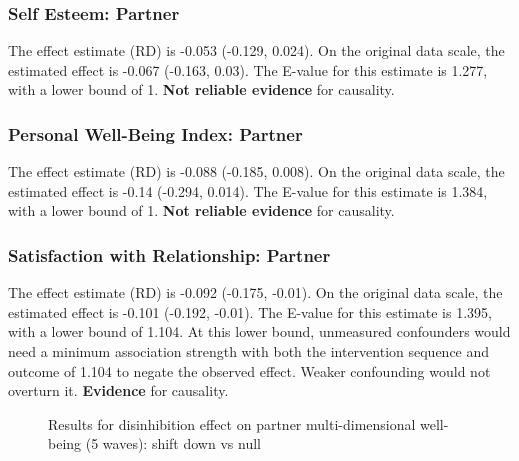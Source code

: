 \documentclass[
  singlecolumn]{article}
\begin{document}
\subsubsection{Self Esteem: Partner}\label{self-esteem-partner-12}

The effect estimate (RD) is -0.053 (-0.129, 0.024). On the original data
scale, the estimated effect is -0.067 (-0.163, 0.03). The E-value for
this estimate is 1.277, with a lower bound of 1. \textbf{Not reliable
evidence} for causality.

\subsubsection{Personal Well-Being Index:
Partner}\label{personal-well-being-index-partner-12}

The effect estimate (RD) is -0.088 (-0.185, 0.008). On the original data
scale, the estimated effect is -0.14 (-0.294, 0.014). The E-value for
this estimate is 1.384, with a lower bound of 1. \textbf{Not reliable
evidence} for causality.

\subsubsection{Satisfaction with Relationship:
Partner}\label{satisfaction-with-relationship-partner-12}

The effect estimate (RD) is -0.092 (-0.175, -0.01). On the original data
scale, the estimated effect is -0.101 (-0.192, -0.01). The E-value for
this estimate is 1.395, with a lower bound of 1.104. At this lower
bound, unmeasured confounders would need a minimum association strength
with both the intervention sequence and outcome of 1.104 to negate the
observed effect. Weaker confounding would not overturn it.
\textbf{Evidence} for causality.

\begin{figure}


\caption{\label{fig-results-disinhibition-partner-down-long}Results for
disinhibition effect on partner multi-dimensional well-being (5 waves):
shift down vs null}

\end{figure}%

\newpage{}
\end{document}
